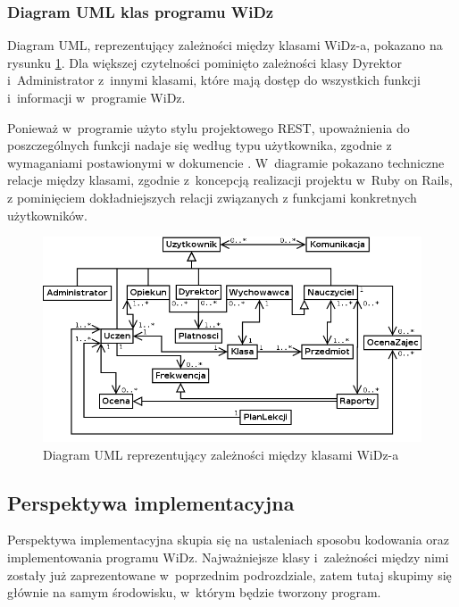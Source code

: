 \documentclass[12pt,leqno,twoside]{mwart}
\begin{document}
\subsubsection{Diagram UML klas programu WiDz}\label{UML}
\noindent Diagram UML, reprezentujący zależności między klasami WiDz-a, pokazano na rysunku \ref{fig:uml}. Dla większej czytelności pominięto zależności klasy Dyrektor i~Administrator z~innymi klasami, które mają dostęp do wszystkich funkcji i~informacji w~programie WiDz.

\indent Ponieważ w~programie użyto stylu projektowego REST, upoważnienia do poszczególnych funkcji nadaje się według typu użytkownika, zgodnie z wymaganiami postawionymi w dokumencie \cite{WYM}. W~diagramie pokazano techniczne relacje między klasami, zgodnie z~koncepcją realizacji projektu w~Ruby on Rails, z pominięciem dokładniejszych relacji związanych z funkcjami konkretnych użytkowników.
\begin{figure}[ht]
\center
\includegraphics[width=16cm]{uml_klas.png}
\caption{Diagram UML reprezentujący zależności między klasami WiDz-a}
\label{fig:uml}
\end{figure}

\subsection{Perspektywa implementacyjna}
\noindent Perspektywa implementacyjna skupia się na ustaleniach sposobu kodowania oraz implementowania programu WiDz. Najważniejsze klasy i~zależności między nimi zostały już zaprezentowane w~poprzednim podrozdziale, zatem tutaj skupimy się głównie na samym środowisku, w~którym będzie tworzony program.

\end{document}
